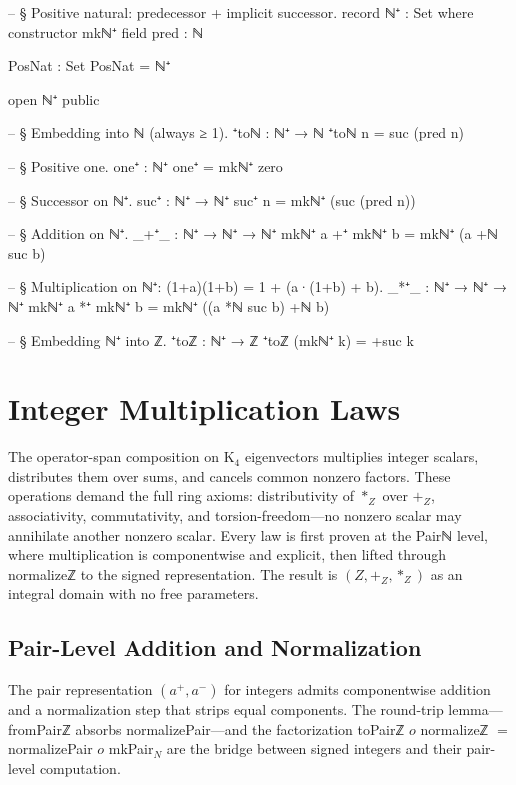 \documentclass[11pt,a4paper]{book}
\def\circ{o}%
\def\mathbb#1{#1}%
\def\texttt#1{#1}%
\begin{document}
\begin{code}
-- § Positive natural: predecessor + implicit successor.
record ℕ⁺ : Set where
  constructor mkℕ⁺
  field
    pred : ℕ

PosNat : Set
PosNat = ℕ⁺

open ℕ⁺ public

-- § Embedding into ℕ (always ≥ 1).
⁺toℕ : ℕ⁺ → ℕ
⁺toℕ n = suc (pred n)

-- § Positive one.
one⁺ : ℕ⁺
one⁺ = mkℕ⁺ zero

-- § Successor on ℕ⁺.
suc⁺ : ℕ⁺ → ℕ⁺
suc⁺ n = mkℕ⁺ (suc (pred n))

-- § Addition on ℕ⁺.
_+⁺_ : ℕ⁺ → ℕ⁺ → ℕ⁺
mkℕ⁺ a +⁺ mkℕ⁺ b = mkℕ⁺ (a +ℕ suc b)

-- § Multiplication on ℕ⁺: (1+a)(1+b) = 1 + (a·(1+b) + b).
_*⁺_ : ℕ⁺ → ℕ⁺ → ℕ⁺
mkℕ⁺ a *⁺ mkℕ⁺ b = mkℕ⁺ ((a *ℕ suc b) +ℕ b)

-- § Embedding ℕ⁺ into ℤ.
⁺toℤ : ℕ⁺ → ℤ
⁺toℤ (mkℕ⁺ k) = +suc k
\end{code}

\chapter{Integer Multiplication Laws}

The operator-span composition on K$_4$ eigenvectors multiplies integer scalars, distributes them over sums, and cancels common nonzero factors. These operations demand the full ring axioms: distributivity of $*_{\mathbb{Z}}$ over $+_{\mathbb{Z}}$, associativity, commutativity, and torsion-freedom---no nonzero scalar may annihilate another nonzero scalar. Every law is first proven at the \texttt{Pairℕ} level, where multiplication is componentwise and explicit, then lifted through \texttt{normalizeℤ} to the signed representation. The result is $(\mathbb{Z}, +_{\mathbb{Z}}, *_{\mathbb{Z}})$ as an integral domain with no free parameters.

\section{Pair-Level Addition and Normalization}

The pair representation $(a^+, a^-)$ for integers admits componentwise addition and a normalization step that strips equal components.
The round-trip lemma---\texttt{fromPairℤ} absorbs \texttt{normalizePair}---and the factorization \texttt{toPairℤ} $\circ$ \texttt{normalizeℤ} $=$ \texttt{normalizePair} $\circ$ \texttt{mkPair$_{\mathbb{N}}$} are the bridge between signed integers and their pair-level computation.
\end{document}
